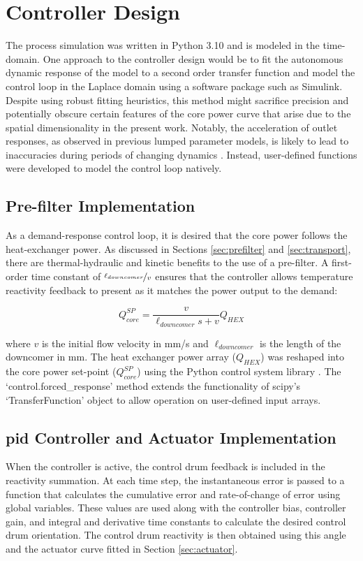 \chapter{Controller Design}
\label{Chapter:Design}

The process simulation was written in Python 3.10 and is modeled in the time-domain. One approach to the controller design would be to fit the autonomous dynamic response of the model to a second order transfer function and model the control loop in the Laplace domain using a software package such as Simulink. Despite using robust fitting heuristics, this method might sacrifice precision and potentially obscure certain features of the core power curve that arise due to the spatial dimensionality in the present work.  Notably, the acceleration of outlet responses, as observed in previous lumped parameter models, is likely to lead to inaccuracies during periods of changing dynamics \cite{msreSimulink}. Instead, user-defined functions were developed to model the control loop natively.

\section{Pre-filter Implementation}
As a demand-response control loop, it is desired that the core power follows the heat-exchanger power. As discussed in Sections \ref{sec:prefilter} and \ref{sec:transport}, there are thermal-hydraulic and kinetic benefits to the use of a pre-filter. A first-order time constant of $\nicefrac{\ell_{downcomer}}{v}$ ensures that the controller allows temperature reactivity feedback to present as it matches the power output to the demand:

\begin{equation}
    Q_{core}^{SP} = \frac{v}{\ell_{downcomer}s+v} Q_{HEX}    
\end{equation}

where $v$ is the initial flow velocity in mm/s and $\ell_{downcomer}$ is the length of the downcomer in mm. The heat exchanger power array ($Q_{HEX}$) was reshaped into the core power set-point ($Q_{core}^{SP}$) using the Python control system library \cite{ct}. The `control.forced\_response' method extends the functionality of scipy's `TransferFunction' object to allow operation on user-defined input arrays.

\section{\texorpdfstring{\acs{pid}}{PID} Controller and Actuator Implementation}
When the controller is active, the control drum feedback is included in the reactivity summation. At each time step, the instantaneous error is passed to a function that calculates the cumulative error and rate-of-change of error using global variables. These values are used along with the controller bias, controller gain, and integral and derivative time constants to calculate the desired control drum orientation. The control drum reactivity is then obtained using this angle and the actuator curve fitted in Section \ref{sec:actuator}. 

